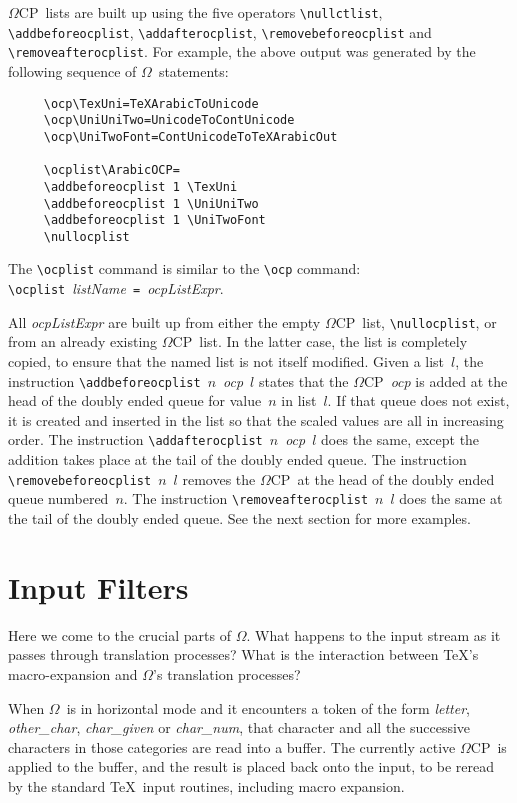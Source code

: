 \documentclass[fleqn]{article}
\newcommand{\OMEGA}{$\Omega$}
\newcommand{\OCP}{\OMEGA CP}
\begin{document}
\OCP\ lists are built up using the five operators \verb|\nullctlist|,
\verb|\addbefore|\-\verb|ocp|\-\verb|list|, \verb|\addafterocplist|,
\verb|\removebeforeocplist| and \verb|\removeafter|\-\verb|ocp|\-\verb|list|.
For example, the above output was generated by the following
sequence of \OMEGA\ statements:
\begin{verbatim}
     \ocp\TexUni=TeXArabicToUnicode
     \ocp\UniUniTwo=UnicodeToContUnicode
     \ocp\UniTwoFont=ContUnicodeToTeXArabicOut

     \ocplist\ArabicOCP=
     \addbeforeocplist 1 \TexUni
     \addbeforeocplist 1 \UniUniTwo
     \addbeforeocplist 1 \UniTwoFont
     \nullocplist
\end{verbatim}

The \verb|\ocplist| command is similar to the \verb|\ocp| command:\\
\verb|\ocplist|~\emph{listName}~\verb|=|~\emph{ocpListExpr}.

All \emph{ocpListExpr} are built up from either the empty \OCP\ list,
\verb|\nullocplist|, or from an already existing \OCP\ list.  In the
latter case, the list is completely copied, to ensure that the named
list is not itself modified.  Given a list~$l$, the instruction
\verb|\addbeforeocplist|~$n$~\emph{ocp}~$l$ states that the
\OCP\ \emph{ocp} is added at the head of the doubly ended queue for
value~$n$ in list~$l$.  If that queue does not exist, it is created
and inserted in the list so that the scaled values are all in
increasing order.  The instruction
\verb|\addafterocplist|~$n$~\emph{ocp}~$l$ does the same, except the
addition takes place at the tail of the doubly ended queue.  The
instruction
\verb|\removebeforeocplist|~$n$~$l$ removes the \OCP\ at the head of the
doubly ended queue numbered~$n$.  The instruction
\verb|\removeafterocplist|~$n$~$l$ does the same at the tail of the
doubly ended queue.  See the next section for more examples.

\section{Input Filters}

Here we come to the crucial parts of \OMEGA.  What happens to the
input stream as it passes through translation processes?  What is
the interaction between \TeX's macro-expansion and \OMEGA's translation 
processes?

When \OMEGA\ is in horizontal mode and it encounters a
token of the form
\emph{letter}, \emph{other\_char}, \emph{char\_given} or
\emph{char\_num}, that character and all the successive 
characters in those categories are read into a buffer.
The currently active \OCP\ is applied to the buffer, and 
the result is placed back onto the input, to be reread
by the standard \TeX\ input routines, including macro
expansion.
\end{document}
